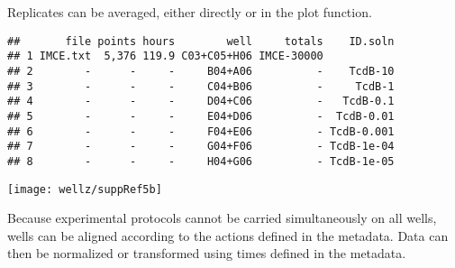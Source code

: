 Replicates can be averaged, either directly or in the plot function.

\singlespacing
\begin{knitrout}
\color{fgcolor}\begin{kframe}
\begin{alltt}
 \hlkwb{=} 
\end{alltt}
\begin{verbatim}
##       file points hours        well     totals    ID.soln
## 1 IMCE.txt  5,376 119.9 C03+C05+H06 IMCE-30000           
## 2        -      -     -     B04+A06          -    TcdB-10
## 3        -      -     -     C04+B06          -     TcdB-1
## 4        -      -     -     D04+C06          -   TcdB-0.1
## 5        -      -     -     E04+D06          -  TcdB-0.01
## 6        -      -     -     F04+E06          - TcdB-0.001
## 7        -      -     -     G04+F06          - TcdB-1e-04
## 8        -      -     -     H04+G06          - TcdB-1e-05
\end{verbatim}
\begin{alltt}
 \hlkwb{=} \hlstd{(}\hlstd{,}\hlstd{),}\hlstd{=}\hlstd{)}
\hlstd{=}\hlstd{,}\hlstd{=}\hlstd{(}\hlopt{-}\hlstd{,}\hlstd{))}
\end{alltt}
\end{kframe}
\texttt{[image: wellz/suppRef5b]} 
\end{knitrout}
\doublespacing

Because experimental protocols cannot be carried
simultaneously on all wells, 
wells can be aligned according to the actions defined in the metadata.
Data can then be normalized or transformed using times defined
in the metadata.

